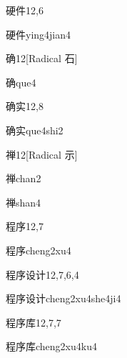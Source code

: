 \begin{entry}{硬件}{12,6}
  \begin{phonetics}{硬件}{ying4jian4}
  \end{phonetics}
\end{entry}

\begin{entry}{确}{12}[Radical 石]
  \begin{phonetics}{确}{que4}
  \end{phonetics}
\end{entry}

\begin{entry}{确实}{12,8}
  \begin{phonetics}{确实}{que4shi2}
  \end{phonetics}
\end{entry}

\begin{entry}{禅}{12}[Radical 示]
  \begin{phonetics}{禅}{chan2}
  \end{phonetics}
  \begin{phonetics}{禅}{shan4}
  \end{phonetics}
\end{entry}

\begin{entry}{程序}{12,7}
  \begin{phonetics}{程序}{cheng2xu4}
  \end{phonetics}
\end{entry}

\begin{entry}{程序设计}{12,7,6,4}
  \begin{phonetics}{程序设计}{cheng2xu4she4ji4}
  \end{phonetics}
\end{entry}

\begin{entry}{程序库}{12,7,7}
  \begin{phonetics}{程序库}{cheng2xu4ku4}
  \end{phonetics}
\end{entry}

